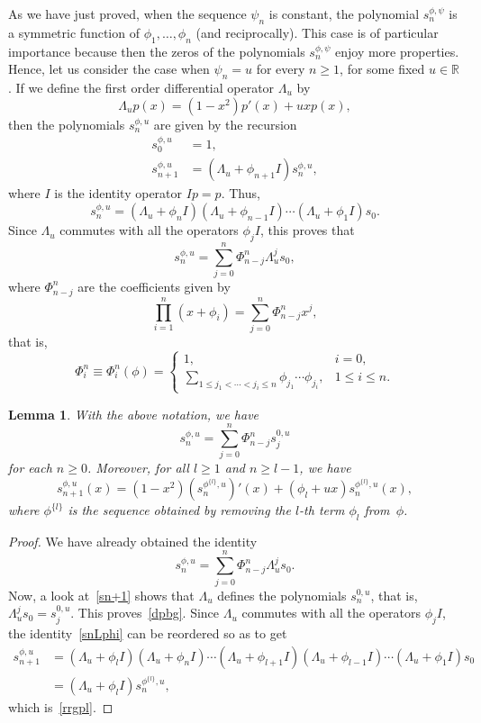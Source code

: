 \documentclass[10pt, a4paper, leqno]{amsart}
\numberwithin{equation}{section}
\theoremstyle{plain}
\newtheorem{Lem}[Theo]{Lemma}
\theoremstyle{remark}
\newcommand{\RR}{\mathbb{R}}
\newcommand{\spp}{s^{\phi,\psi}}
\begin{document}
As we have just proved, when the sequence $\psi_n$ is constant, the polynomial $\spp_n$ is a symmetric function of $\phi_1,\dots, \phi_n$ (and reciprocally). This case is of particular importance because then the zeros of the polynomials $\spp_n$ enjoy more properties. Hence, let us consider the case when $\psi_n = u$ for every $n \ge 1$, for some fixed $u \in \RR$. If we define the first order differential operator $\Lambda_u$ by
\[
  \Lambda_up(x) = (1-x^2)p'(x)+uxp(x),
\]
then the polynomials $s_n^{\phi,u}$ are given by the recursion
\begin{align*}
  s_0^{\phi,u} &= 1,
  \\
  s_{n+1}^{\phi,u} &= (\Lambda_u + \phi_{n+1} I) s_n^{\phi,u},
\end{align*}
where $I$ is the identity operator $I p = p$. Thus,
\begin{equation}
\label{snLphi}
  s_n^{\phi,u}
  = (\Lambda_u + \phi_n I) (\Lambda_u + \phi_{n-1} I) \cdots (\Lambda_u + \phi_1 I) s_0.
\end{equation}
Since $\Lambda_u$ commutes with all the operators $\phi_j I$, this proves that
\[
  s_n^{\phi,u} = \sum_{j=0}^n \Phi_{n-j}^n \Lambda_u^j s_0,
\]
where $\Phi_{n-j}^n$ are the coefficients given by
\[
  \prod_{i=1}^n (x+\phi_i) = \sum_{j=0}^n\Phi_{n-j}^nx^j,
\]
that is,
\[
  \Phi_i^n \equiv \Phi_i^n(\phi)
  = \begin{cases}
  1, &i=0,
  \\
  \sum\limits_{1\le j_1< \cdots <j_i \le n} \phi_{j_1} \cdots \phi_{j_i},
  &1 \le i \le n.
  \end{cases}
\]

\begin{Lem}
\label{lrch}
With the above notation, we have
\begin{equation}
\label{dpbg}
  s_n^{\phi,u} = \sum_{j=0}^n \Phi_{n-j}^n s_j^{0,u}
\end{equation}
for each $n \ge 0$.
Moreover, for all $l \ge 1$ and $n\ge l-1$, we have
\begin{equation}
\label{rrgpl}
  s_{n+1}^{\phi,u}(x) = (1-x^2)(s_n^{\phi^{\{ l\}},u})'(x)
  + (\phi_l + u x) s_n^{\phi^{\{ l\}},u}(x),
\end{equation}
where $\phi^{\{l\}}$ is the sequence obtained by removing the $l$-th term $\phi_l$ from~$\phi$.
\end{Lem}

\begin{proof}
We have already obtained the identity
\[
  s_n^{\phi,u} = \sum_{j=0}^n \Phi_{n-j}^n \Lambda_u^j s_0.
\]
Now, a look at~\eqref{sn+1} shows that $\Lambda_u$ defines the polynomials $s_n^{0,u}$, that is,
$\Lambda_u^j s_0 = s_j^{0,u}$. This proves~\eqref{dpbg}. Since $\Lambda_u$ commutes with all the operators $\phi_j I$, the identity~\eqref{snLphi} can be reordered so as to get
\begin{align*}
  s_{n+1}^{\phi,u}
  &= (\Lambda_u + \phi_l I) (\Lambda_u + \phi_n I) \cdots
  (\Lambda_u + \phi_{l+1} I)(\Lambda_u + \phi_{l-1} I) \cdots (\Lambda_u + \phi_1 I) s_0
  \\
  &= (\Lambda_u + \phi_l I) s_n^{\phi^{\{ l\}},u},
\end{align*}
which is~\eqref{rrgpl}.
\end{proof}
\end{document}
